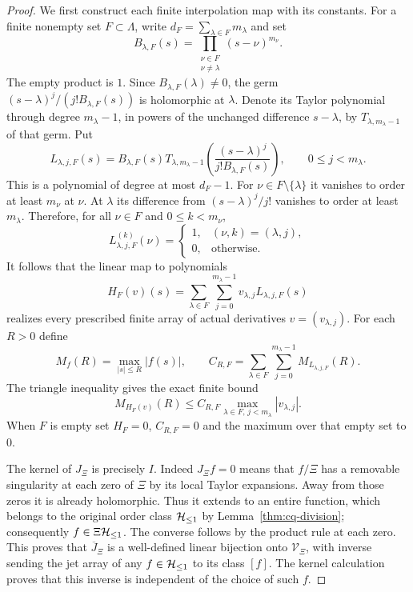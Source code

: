 \begin{proof}
We first construct each finite interpolation map with its constants.
For a finite nonempty set $F\subset\Lambda$, write
$d_F=\sum_{\lambda\in F}m_\lambda$ and set
\[
 B_{\lambda,F}(s)=
 \prod_{\substack{\nu\in F\\\nu\ne\lambda}}
 (s-\nu)^{m_\nu}.
\]
The empty product is $1$. Since
$B_{\lambda,F}(\lambda)\ne0$, the germ
$(s-\lambda)^j/(j!B_{\lambda,F}(s))$ is holomorphic at
$\lambda$. Denote its Taylor polynomial through degree
$m_\lambda-1$, in powers of the unchanged difference
$s-\lambda$, by $T_{\lambda,m_\lambda-1}$ of that germ. Put
\begin{equation}\label{eq:cq-Hermite-basis-unscaled}
 L_{\lambda,j,F}(s)=B_{\lambda,F}(s)
 T_{\lambda,m_\lambda-1}
 \left(\frac{(s-\lambda)^j}{j!B_{\lambda,F}(s)}\right),
 \qquad 0\leq j<m_\lambda.
\end{equation}
This is a polynomial of degree at most $d_F-1$.
For $\nu\in F\setminus\{\lambda\}$ it vanishes to order
at least $m_\nu$ at $\nu$. At $\lambda$ its difference from
$(s-\lambda)^j/j!$ vanishes to order at least $m_\lambda$.
Therefore, for all $\nu\in F$ and $0\leq k<m_\nu$,
\[
 L_{\lambda,j,F}^{(k)}(\nu)
   =\begin{cases}1,&(\nu,k)=(\lambda,j),\\0,&\text{otherwise}.
     \end{cases}
\]
It follows that the linear map to polynomials
\begin{equation}\label{eq:cq-finite-Hermite-lift}
 H_F(v)(s)=\sum_{\lambda\in F}\sum_{j=0}^{m_\lambda-1}
              v_{\lambda,j}L_{\lambda,j,F}(s)
\end{equation}
realizes every prescribed finite array of actual derivatives
$v=(v_{\lambda,j})$. For each $R>0$ define
\[
 M_f(R)=\max_{|s|\leq R}|f(s)|,\qquad
 C_{R,F}=\sum_{\lambda\in F}\sum_{j=0}^{m_\lambda-1}
                  M_{L_{\lambda,j,F}}(R).
\]
The triangle inequality gives the exact finite bound
\begin{equation}\label{eq:cq-Hermite-lift-bound}
 M_{H_F(v)}(R)\leq C_{R,F}
             \max_{\lambda\in F,\,j<m_\lambda}|v_{\lambda,j}|.
\end{equation}
When $F$ is empty set $H_F=0$, $C_{R,F}=0$ and the maximum
over that empty set to $0$.

The kernel of $J_\Xi$ is precisely $I$. Indeed $J_\Xi f=0$
means that $f/\Xi$ has a removable singularity at each zero of
$\Xi$ by its local Taylor expansions. Away from those zeros it
is already holomorphic. Thus it extends to an entire function,
which belongs to the original order class $\mathcal H_{\leq 1}$ by
Lemma~\ref{thm:cq-division}; consequently $f\in\Xi\mathcal H_{\leq 1}$.
The converse follows by the product rule at each zero. This proves
that $\overline J_\Xi$ is a well-defined linear bijection onto
$\mathcal V_\Xi$, with inverse sending the jet array of any
$f\in\mathcal H_{\leq 1}$ to its class $[f]$. The kernel calculation proves
that this inverse is independent of the choice of such $f$.


\end{proof}
